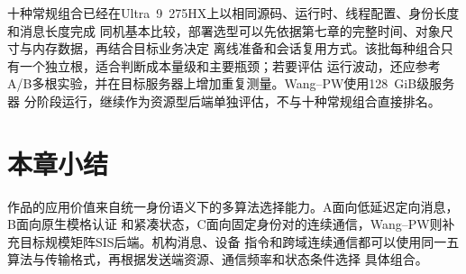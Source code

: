 十种常规组合已经在Ultra~9~275HX上以相同源码、运行时、线程配置、身份长度和消息长度完成
同机基本比较，部署选型可以先依据第七章的完整时间、对象尺寸与内存数据，再结合目标业务决定
离线准备和会话复用方式。该批每种组合只有一个独立根，适合判断成本量级和主要瓶颈；若要评估
运行波动，还应参考A/B多根实验，并在目标服务器上增加重复测量。Wang--PW使用128~GiB级服务器
分阶段运行，继续作为资源型后端单独评估，不与十种常规组合直接排名。

\section{本章小结}

作品的应用价值来自统一身份语义下的多算法选择能力。A面向低延迟定向消息，B面向原生模格认证
和紧凑状态，C面向固定身份对的连续通信，Wang--PW则补充目标规模矩阵SIS后端。机构消息、设备
指令和跨域连续通信都可以使用同一五算法与传输格式，再根据发送端资源、通信频率和状态条件选择
具体组合。
